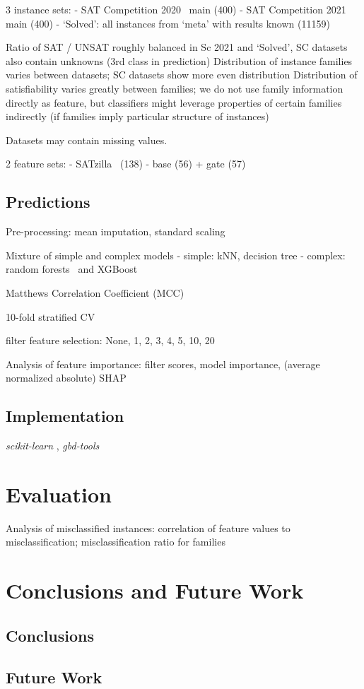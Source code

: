 \documentclass{article}
\begin{document}
3 instance sets:
- SAT Competition 2020~\cite{balyo2020proceedings} main (400)
- SAT Competition 2021~\cite{balyo2021proceedings} main (400)
- `Solved': all instances from `meta' with results known (11159)

Ratio of SAT / UNSAT roughly balanced in Sc 2021 and `Solved', SC datasets also contain unknowns (3rd class in prediction)
Distribution of instance families varies between datasets; SC datasets show more even distribution
Distribution of satisfiability varies greatly between families; we do not use family information directly as feature, but classifiers might leverage properties of certain families indirectly (if families imply particular structure of instances)

Datasets may contain missing values.

2 feature sets:
- SATzilla~\cite{xu2012features} (138)
- base (56) + gate (57)

\subsection{Predictions}

Pre-processing: mean imputation, standard scaling

Mixture of simple and complex models
- simple: kNN, decision tree
- complex: random forests~\cite{breiman2001random} and XGBoost~\cite{chen2016xgboost}

Matthews Correlation Coefficient (MCC)~\cite{matthews1975comparison, gorodkin2004comparing}

10-fold stratified CV

filter feature selection: None, 1, 2, 3, 4, 5, 10, 20

Analysis of feature importance: filter scores, model importance, (average normalized absolute) SHAP~\cite{lundberg2017unified}

\subsection{Implementation}

\emph{scikit-learn} \cite{pedregosa2011scikit}, \emph{gbd-tools}~\cite{iser2020collaborative}

\section{Evaluation}
\label{sec:evaluation}

Analysis of misclassified instances: correlation of feature values to misclassification; misclassification ratio for families

\section{Conclusions and Future Work}
\label{sec:conclusion}

\subsection{Conclusions}

\subsection{Future Work}

\printbibliography
\end{document}
